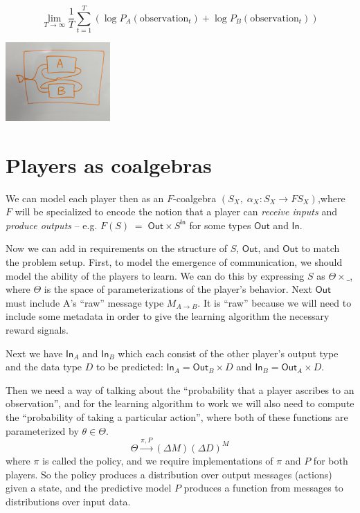 \documentclass{article}
\begin{document}
$$
\lim_{T \to \infty} \frac{1}{T} \sum_{t=1}^{T} \left( \log P_A(\text{observation}_t) + \log P_B(\text{observation}_t) \right)
$$

\bigskip

\begin{center}
\includegraphics[width=0.3\textwidth]{simple.jpg}
\end{center}

\section{Players as coalgebras}

We can model each player then as an $F$-coalgebra 
$(S_X,\;\alpha_X\colon S_X\longrightarrow F S_X)$,where $F$ will be specialized to encode the notion that a player can \emph{receive inputs} and \emph{produce outputs} -- e.g. $F(S)\;=\;\mathsf{Out}\times S^{\mathsf{In}}$ for some types $\mathsf{Out}$ and $\mathsf{In}$.

Now we can add in requirements on the structure of $S$, $\mathsf{Out}$, and $\mathsf{Out}$ to match the problem setup. First, to model the emergence of communication, we should model the ability of the players to learn. We can do this by expressing $S$ as $\Theta \times \_$, where $\Theta$ is the space of parameterizations of the player's behavior. Next $\mathsf{Out}$ must include A's ``raw'' message type $M_{A\rightarrow B}$. It is ``raw'' because we will need to include some metadata in order to give the learning algorithm the necessary reward signals. 

Next we have $\mathsf{In}_A$ and $\mathsf{In}_B$ which each consist of the other player's output type and the data type $D$ to be predicted: $\mathsf{In}_A=\mathsf{Out}_B \times D$ and $\mathsf{In}_B=\mathsf{Out}_A \times D$.

Then we need a way of talking about the ``probability that a player ascribes to an observation'', and for the learning algorithm to work we will also need to compute the ``probability of taking a particular action'', where both of these functions are parameterized by $\theta \in \Theta$.
$$
\Theta \xrightarrow{\pi, P} (\Delta M)(\Delta D)^M
$$ where $\pi$ is called the policy, and we require implementations of $\pi$ and $P$ for both players. So the policy produces a distribution over output messages (actions) given a state, and the predictive model $P$ produces a function from messages to distributions over input data.
\end{document}
